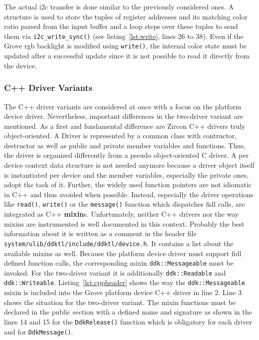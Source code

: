 The actual \ac{i2c} transfer is done similar to the previously considered ones.
A structure is used to store the tuples of register addresses and its matching color ratio parsed from the input buffer and a loop steps over these tuples to send them via \texttt{i2c_write_sync()} (see listing~\ref{lst:write}, lines 26 to 38).
Even if the Grove \ac{rgb} backlight is modified using \texttt{write()}, the internal color state must be updated after a successful update since it is not possible to read it directly from the device.

\subsubsection*{C++ Driver Variants}
The C++ driver variants are considered at once with a focus on the platform device driver.
Nevertheless, important differences in the two-driver variant are mentioned.
As a first and fundamental difference are Zircon C++ drivers truly object-oriented.
A Driver is represented by a common class with contructor, destructor as well as public and private member variables and functions.
Thus, the driver is organized differently from a pseudo object-oriented C driver.
A per device context data structure is not needed anymore because a driver object itself is instantiated per device and the member variables, especially the private ones, adopt the task of it.  
Further, the widely used function pointers are not idiomatic in C++ and thus avoided when possible.
Instead, especially the driver operations like \texttt{read()}, \texttt{write()} or the \texttt{message()} function which dispatches \ac{fidl} calls, are integrated as C++ \textbf{mixin}s.
Unfortunately, neither C++ drivers nor the way mixins are instrumented is well documented in this context.
Probably the best information about it is written as a comment in the header file \texttt{system/ulib/ddktl/include/ddktl/device.h}.
It contains a list about the available mixins as well.
Because the platform device driver must support \ac{fidl} defined function calls, the corresponding mixin \texttt{ddk::Messageable} must be invoked.
For the two-driver variant it is additionally \texttt{ddk::Readable} and \texttt{ddk::Writeable}.
Listing~\ref{lst:cppheader} shows the way the \texttt{ddk::Messageable} mixin is included into the Grove platform device C++ driver in line 2.
Line 3 shows the situation for the two-driver variant.
The mixin functions must be declared in the public section with a defined name and signature as shown in the lines 14 and 15 for the \texttt{DdkRelease()} function which is obligatory for each driver and for \texttt{DdkMessage()}.

